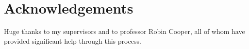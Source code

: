 \documentclass[11pt, a4paper]{article}
\begin{document}
\thispagestyle{empty}

\newpage
\section*{Acknowledgements}

Huge thanks to my supervisors and to professor Robin Cooper, all of whom have provided significant help through this process.

\thispagestyle{empty}

\newpage

\begin{spacing}{0.0}
\glsresetall
\tableofcontents
\end{spacing}

\thispagestyle{empty}

\newpage
\setcounter{page}{1}













%


\end{document}
